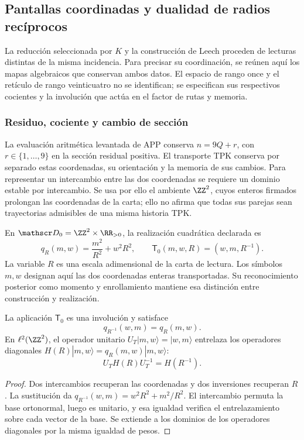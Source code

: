 \subsection{Pantallas coordinadas y dualidad de radios recíprocos}
\label{exc:pantallas-dualidad}

La reducción seleccionada por \(K\) y la construcción de Leech
proceden de lecturas distintas de la misma incidencia. Para precisar
su coordinación, se reúnen aquí los mapas algebraicos que conservan
ambos datos. El espacio de rango once y el retículo de rango veinticuatro
no se identifican; se especifican sus respectivos cocientes y la
involución que actúa en el factor de rutas y memoria.

\subsubsection{Residuo, cociente y cambio de sección}

La evaluación aritmética levantada de APP conserva
\(n=9Q+r\), con \(r\in\{1,\ldots,9\}\) en la sección
residual positiva. El transporte TPK conserva por separado estas
coordenadas, su orientación y la memoria de sus cambios. Para
representar un intercambio entre las dos coordenadas se requiere
un dominio estable por intercambio. Se usa por ello el ambiente
\(\ZZ^2\), cuyos enteros firmados prolongan las coordenadas de
la carta; ello no afirma que todas sus parejas sean trayectorias
admisibles de una misma historia TPK.

En \(\mathscr D_0=\ZZ^2\times\RR_{>0}\), la realización cuadrática
declarada es
\begin{equation}
 q_R(m,w)=\frac{m^2}{R^2}+w^2R^2,
 \qquad \mathsf T_0(m,w,R)=(w,m,R^{-1}).
 \label{eq:dualidad-normalizada-k}
\end{equation}
La variable \(R\) es una escala adimensional de la carta de lectura.
Los símbolos \(m,w\) designan aquí las dos coordenadas enteras
transportadas. Su reconocimiento posterior como momento y enrollamiento
mantiene esa distinción entre construcción y realización.

\begin{proposition}
\label{prop:dualidad-radios-k}
La aplicación \(\mathsf T_0\) es una involución y satisface
\[
 q_{R^{-1}}(w,m)=q_R(m,w).
\]
En \(\ell^2(\ZZ^2)\), el operador unitario
\(U_T|m,w\rangle=|w,m\rangle\) entrelaza los operadores
diagonales \(H(R)|m,w\rangle=q_R(m,w)|m,w\rangle\):
\[
 U_TH(R)U_T^{-1}=H(R^{-1}).
\]
\end{proposition}
\begin{proof}
Dos intercambios recuperan las coordenadas y dos inversiones recuperan
\(R\). La sustitución da
\(q_{R^{-1}}(w,m)=w^2R^2+m^2/R^2\). El intercambio permuta
la base ortonormal, luego es unitario, y esa igualdad verifica el
entrelazamiento sobre cada vector de la base. Se extiende a los
dominios de los operadores diagonales por la misma igualdad de pesos.
\end{proof}

